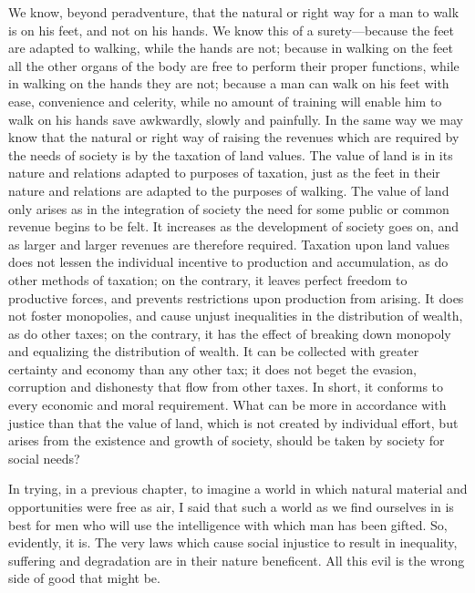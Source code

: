 \documentclass{book}
\begin{document}
We know, beyond peradventure, that the natural or right way for a man to walk is on his feet, and not on his hands. We know this of a surety—because the feet are adapted to walking, while the hands are not; because in walking on the feet all the other organs of the body are free to perform their proper functions, while in walking on the hands they are not; because a man can walk on his feet with ease, convenience and celerity, while no amount of training will enable him to walk on his hands save awkwardly, slowly and painfully. In the same way we may know that the natural or right way of raising the revenues which are required by the needs of society is by the taxation of land values. The value of land is in its nature and relations adapted to purposes of taxation, just as the feet in their nature and relations are adapted to the purposes of walking. The value of land only arises as in the integration of society the need for some public or common revenue begins to be felt. It increases as the development of society goes on, and as larger and larger revenues are therefore required. Taxation upon land values does not lessen the individual incentive to production and accumulation, as do other methods of taxation; on the contrary, it leaves perfect freedom to productive forces, and prevents restrictions upon production from arising. It does not foster monopolies, and cause unjust inequalities in the distribution of wealth, as do other taxes; on the contrary, it has the effect of breaking down monopoly and equalizing the distribution of wealth. It can be collected with greater certainty and economy than any other tax; it does not beget the evasion, corruption and dishonesty that flow from other taxes. In short, it conforms to every economic and moral requirement. What can be more in accordance with justice than that the value of land, which is not created by individual effort, but arises from the existence and growth of society, should be taken by society for social needs?


In trying, in a previous chapter, to imagine a world in which natural material and opportunities were free as air, I said that such a world as we find ourselves in is best for men who will use the intelligence with which man has been gifted. So, evidently, it is. The very laws which cause social injustice to result in inequality, suffering and degradation are in their nature beneficent. All this evil is the wrong side of good that might be.
\end{document}
